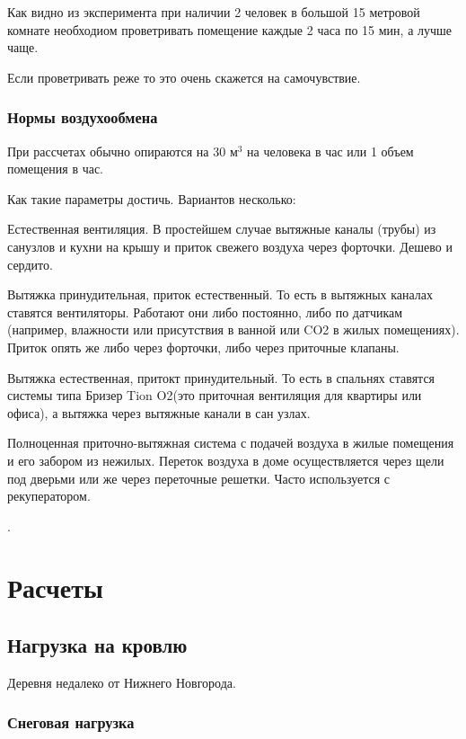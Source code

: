 \documentclass[10pt, twocolumn]{report}
\newenvironment{itemize*}%
{\begin{itemize}%
	\setlength{\itemsep}{1pt}%
	\setlength{\parskip}{1pt}}%
{\end{itemize}}
\begin{document}
Как видно из эксперимента при наличии 2 человек в большой 15 метровой комнате необходиом проветривать помещение каждые 2 часа по 15 мин, а лучше чаще.

Если проветривать реже то это очень скажется на самочувствие.  

\section{Нормы воздухообмена}

При рассчетах обычно опираются на 30 $\text{м}^3$ на человека в час или 1 объем помещения в час.

Как такие параметры достичь. Вариантов несколько:

\begin{itemize*}
	\item Естественная вентиляция. В простейшем случае вытяжные каналы (трубы) из санузлов и кухни на крышу и приток свежего воздуха через форточки. Дешево и сердито.
	\item  Вытяжка принудительная, приток естественный. То есть в вытяжных каналах ставятся вентиляторы. Работают они либо постоянно, либо по датчикам (например, влажности или присутствия в ванной или CO2 в жилых помещениях). Приток опять же либо через форточки, либо через приточные клапаны.
	\item Вытяжка естественная, притокт принудительный.
	То есть в спальнях ставятся системы типа Бризер Tion O2(это приточная вентиляция для квартиры или офиса), а вытяжка через вытяжные канали в сан узлах.
	\item Полноценная приточно-вытяжная система с подачей воздуха в жилые помещения и его забором из нежилых. Переток воздуха в доме осуществляется через щели под дверьми или же через переточные решетки. Часто используется с рекуператором.
\end{itemize*}. 


\part{Расчеты}

\chapter{Нагрузка на кровлю}

Деревня недалеко от Нижнего Новгорода.

\section{Снеговая нагрузка}
\end{document}
